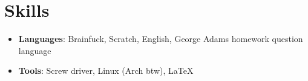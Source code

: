 \documentclass[letterpaper,11pt]{article} %
\begin{document}

\section{Skills}

\begin{itemize}[itemsep=-0.3em, leftmargin=5pt, label={}]
  \item \textbf{\large Languages}: Brainfuck, Scratch, English, George Adams homework question language
  \item \textbf{\large Tools}: Screw driver, Linux (Arch btw), \LaTeX
\end{itemize}
\end{document}
